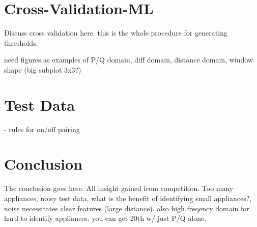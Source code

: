 \documentclass[conference]{IEEEtran}
\begin{document}
	
	
	
	
	
	
	
	\section{Cross-Validation-ML}
	Discuss cross validation here. this is the whole procedure for generating thresholds.
	
	need figures as examples of P/Q domain, diff domain, distance domain, window shape (big subplot 3x3?)
	
	\section{Test Data}
	- rules for on/off pairing
	
	\section{Conclusion}
	The conclusion goes here. All insight gained from competition. Too many appliances, noisy test data, what is the benefit of identifying small appliances?, noise necessitates clear features (large distance).  also high freqency domain for hard to identify appliances.  you can get 20th w/ just P/Q alone.   
	
\end{document}
